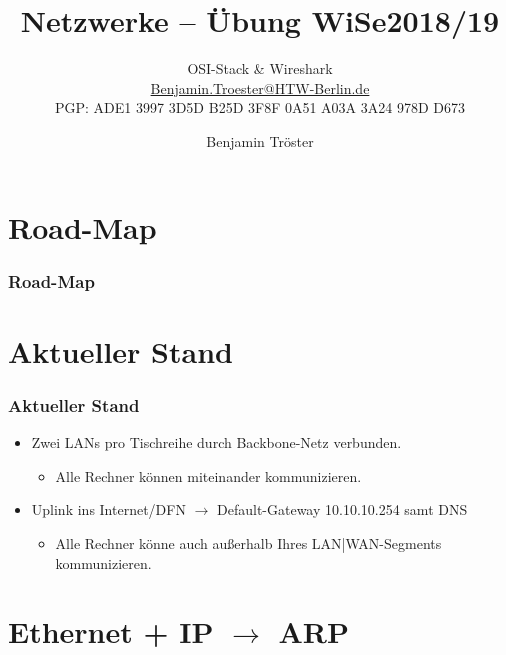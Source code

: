 \documentclass[xcolor=dvipsnames, aspectratio=169]{beamer}
\begin{document}

\title{Netzwerke -- Übung WiSe2018/19}
\subtitle{OSI-Stack \& Wireshark\\
		\href{mailto:Benjamin.Troester@HTW-Berlin.de}{Benjamin.Troester@HTW-Berlin.de}\\
		PGP: ADE1 3997 3D5D B25D 3F8F 0A51 A03A 3A24 978D D673 }
\author{Benjamin Tröster}

\date{}

\begin{frame}
\titlepage

\end{frame}

\section*{Road-Map}
\begin{frame}
\frametitle{Road-Map}
\begin{multicols}{2}
  \tableofcontents
\end{multicols}
\end{frame}

\section{Aktueller Stand}
\begin{frame}
	\frametitle{Aktueller Stand}
	\begin{itemize}
		\item Zwei LANs pro Tischreihe durch Backbone-Netz verbunden.
		\begin{itemize}
			\item Alle Rechner können miteinander kommunizieren.
		\end{itemize}
		\item Uplink ins Internet/DFN $\rightarrow$ Default-Gateway 10.10.10.254 samt DNS
		\begin{itemize}
			\item Alle Rechner könne auch außerhalb Ihres LAN|WAN-Segments kommunizieren.
		\end{itemize}
	\end{itemize}
\end{frame}

\section{Ethernet + IP $\rightarrow$ ARP}
\end{document}
